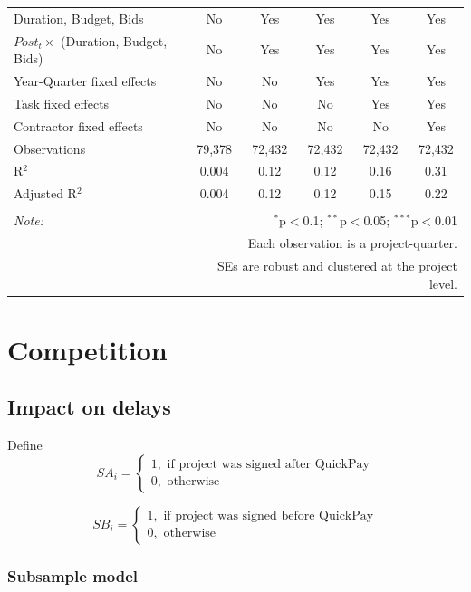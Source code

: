 \documentclass[
]{article}
\begin{document}
\begin{table}[H]
\begin{tabular}{@{\extracolsep{-2pt}}lccccc}
Duration, Budget, Bids & No & Yes & Yes & Yes & Yes \\ 
$Post_t \times $  (Duration, Budget, Bids) & No & Yes & Yes & Yes & Yes \\ 
Year-Quarter fixed effects & No & No & Yes & Yes & Yes \\ 
Task fixed effects & No & No & No & Yes & Yes \\ 
Contractor fixed effects & No & No & No & No & Yes \\ 
Observations & 79,378 & 72,432 & 72,432 & 72,432 & 72,432 \\ 
R$^{2}$ & 0.004 & 0.12 & 0.12 & 0.16 & 0.31 \\ 
Adjusted R$^{2}$ & 0.004 & 0.12 & 0.12 & 0.15 & 0.22 \\ 
\hline 
\hline \\[-1.8ex] 
\textit{Note:}  & \multicolumn{5}{r}{$^{*}$p$<$0.1; $^{**}$p$<$0.05; $^{***}$p$<$0.01} \\ 
 & \multicolumn{5}{r}{Each observation is a project-quarter.} \\ 
 & \multicolumn{5}{r}{SEs are robust and clustered at the project level.} \\ 
\end{tabular} 
\end{table}

\hypertarget{competition}{%
\section{Competition}\label{competition}}

\hypertarget{impact-on-delays}{%
\subsection{Impact on delays}\label{impact-on-delays}}

Define
\[ SA_i = \begin{cases} 1, \text{ if project was signed after QuickPay}\\
0, \text{ otherwise} \end{cases}\]

\[ SB_i = \begin{cases} 1, \text{ if project was signed before QuickPay}\\
0, \text{ otherwise} \end{cases}\]

\hypertarget{subsample-model}{%
\subsubsection{Subsample model}\label{subsample-model}}
\end{document}
